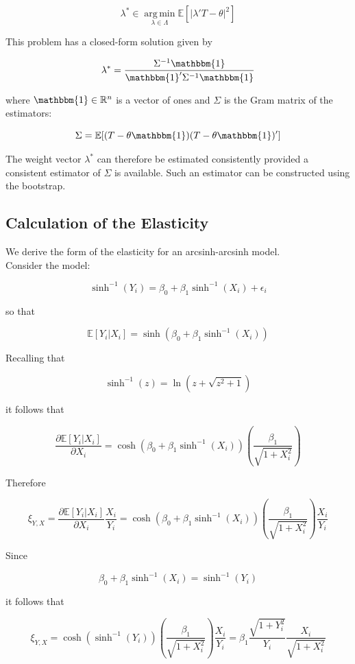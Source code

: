 \documentclass[11pt]{article}
\numberwithin{equation}{section}
\DeclareMathOperator*{\argmin}{arg\,min}
\theoremstyle{remark}
\begin{document}
$$\lambda^* \in \argmin \limits_{\lambda \in \Lambda} \mathbb{E}[|\lambda'T-\theta|^2]$$

This problem has a closed-form solution given by


$$\lambda^*= \dfrac{\Sigma^{-1} \mathbbm{1}}{\mathbbm{1}'\Sigma^{-1} \mathbbm{1}}$$

where $\mathbbm{1} \in \mathbb{R}^n$ is a vector of ones and $\Sigma$ is the Gram matrix of the estimators:

$$\Sigma=\mathbb{E}[(T-\theta \mathbbm{1})(T-\theta \mathbbm{1})']$$

The weight vector $\lambda^*$ can therefore be estimated consistently provided a consistent estimator of $\Sigma$ is available. Such an estimator can be constructed using the bootstrap.



\newpage


\subsection{Calculation of the Elasticity} \label{S: Cálculo}

We derive the form of the elasticity for an arcsinh-arcsinh model.\\

Consider the model:


$$\sinh^{-1}(Y_i)=\beta_0+\beta_1\sinh^{-1}(X_i)+\epsilon_i$$

so that

$$\mathbb{E}[Y_i|X_i]=\sinh\left( \beta_0+\beta_1\sinh^{-1}(X_i)\right)$$

Recalling that


$$\sinh^{-1}(z)=\ln(z+\sqrt{z^2+1})$$

it follows that

$$\dfrac{\partial \mathbb{E}[Y_i|X_i]}{ \partial X_i}=\cosh\left( \beta_0+\beta_1\sinh^{-1}(X_i)\right) \left( \dfrac{\beta_1 }{\sqrt{1+X_i^2}}\right)$$

Therefore

$$\xi_{Y,X}=\dfrac{\partial \mathbb{E}[Y_i|X_i]}{ \partial X_i} \dfrac{X_i}{Y_i} =\cosh\left( \beta_0+\beta_1\sinh^{-1}(X_i)\right) \left( \dfrac{\beta_1 }{\sqrt{1+X_i^2}}\right) \dfrac{X_i}{Y_i}$$

Since

$$\beta_0+\beta_1\sinh^{-1}(X_i)=\sinh^{-1}(Y_i)$$

it follows that

$$\xi_{Y,X}=\cosh\left(\sinh^{-1}(Y_i)\right) \left( \dfrac{\beta_1 }{\sqrt{1+X_i^2}}\right) \dfrac{X_i}{Y_i}=\beta_1 \dfrac{\sqrt{1+Y_i^2}}{Y_i} \dfrac{X_i}{\sqrt{1+X_i^2}}$$
\end{document}
